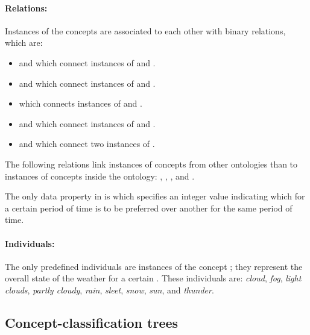 \paragraph{Relations:}

Instances of the concepts are associated to each other with binary relations, which are:

\begin{itemize}
  \item {} and  which connect instances of  and .
  \item {} and  which connect instances of  and .
  \item {} which connects instances of  and .
  \item {} and  which connect instances of  and .
  \item {} and  which connect two instances of .
\end{itemize}

The following relations link instances of concepts from other ontologies than \thinkhomeweather to instances of concepts inside the ontology: , , , and .

The only data property in \thinkhomeweather is  which specifies an integer value indicating which  for a certain period of time is to be preferred over another  for the same period of time.

\paragraph{Individuals:}

The only predefined individuals are instances of the concept ; they represent the overall state of the weather for a certain . These individuals are: \emph{cloud}, \emph{fog}, \emph{light clouds}, \emph{partly cloudy}, \emph{rain}, \emph{sleet}, \emph{snow}, \emph{sun}, and \emph{thunder}.

\subsection{Concept-classification trees}
\label{sec:concept_classification_trees}

